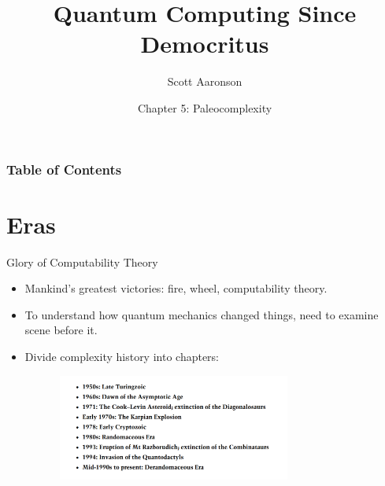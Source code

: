 \documentclass[
    11pt, %
    aspectratio=169, %
]{beamer}
\title[Paleocomplexity]{Quantum Computing Since Democritus}
\subtitle{Scott Aaronson}
\author[Quantum Computing Since Democritus]{Chapter 5: Paleocomplexity}
\institute[]{Saumya Chaturvedi \\ \smallskip }
\date[27 March 2023]
\begin{document}
\section{}
\begin{frame}
	\titlepage %
 
\end{frame}


\begin{frame}
	\frametitle{Table of Contents} %
	
	\tableofcontents %
\end{frame}

\section{Eras}
\begin{frame}{Glory of Computability Theory}
    \begin{itemize}
        \item Mankind's greatest victories: fire, wheel, computability theory.
        \item To understand how quantum mechanics changed things, need to examine scene before it.
        \item Divide complexity history into chapters: 
        
        \includegraphics[angle=0,width=10cm,height=3.5cm]{complexityeras.png}
    \end{itemize}
\end{frame}
\end{document}
